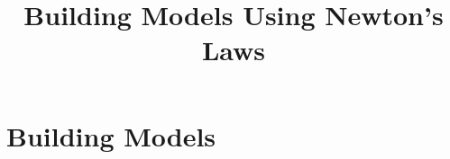 \documentclass[aspectratio=169,
hyperref={colorlinks,urlcolor=blue}
]{beamer}
\begin{document}

\section{Building Models}
\label{sec:buildingmodels}
\title{Building Models Using Newton's Laws}
\author{\insertsubsection}


\begin{frame}
\titlepage
\thispagestyle{empty}
\end{frame}













\end{document}
